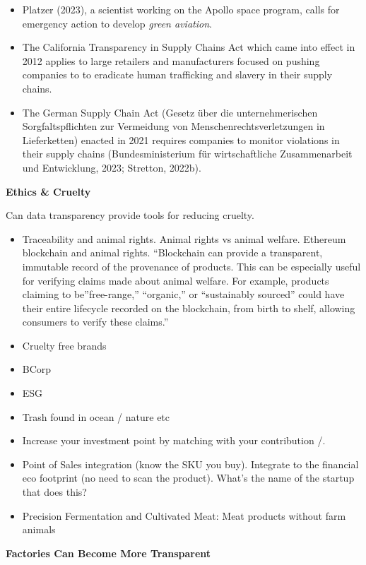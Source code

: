 \documentclass[
  letterpaper,
  DIV=11,
  numbers=noendperiod]{scrartcl}
\begin{document}
\begin{itemize}
\item
  Platzer (2023), a scientist working on the Apollo space program, calls
  for emergency action to develop \emph{green aviation}.
\item
  The California Transparency in Supply Chains Act which came into
  effect in 2012 applies to large retailers and manufacturers focused on
  pushing companies to to eradicate human trafficking and slavery in
  their supply chains.
\item
  The German Supply Chain Act (Gesetz über die unternehmerischen
  Sorgfaltspflichten zur Vermeidung von Menschenrechtsverletzungen in
  Lieferketten) enacted in 2021 requires companies to monitor violations
  in their supply chains (Bundesministerium für wirtschaftliche
  Zusammenarbeit und Entwicklung, 2023; Stretton, 2022b).
\end{itemize}

\textbf{Ethics \& Cruelty}

Can data transparency provide tools for reducing cruelty.

\begin{itemize}
\item
  Traceability and animal rights. Animal rights vs animal welfare.
  Ethereum blockchain and animal rights. ``Blockchain can provide a
  transparent, immutable record of the provenance of products. This can
  be especially useful for verifying claims made about animal welfare.
  For example, products claiming to be''free-range,'' ``organic,'' or
  ``sustainably sourced'' could have their entire lifecycle recorded on
  the blockchain, from birth to shelf, allowing consumers to verify
  these claims.''
\item
  Cruelty free brands
\item
  BCorp
\item
  ESG
\item
  Trash found in ocean / nature etc
\item
  Increase your investment point by matching with your contribution /.
\item
  Point of Sales integration (know the SKU you buy). Integrate to the
  financial eco footprint (no need to scan the product). What's the name
  of the startup that does this?
\item
  Precision Fermentation and Cultivated Meat: Meat products without farm
  animals
\end{itemize}

\textbf{Factories Can Become More Transparent}
\end{document}
